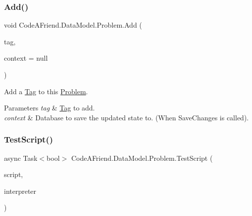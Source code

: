 \subsubsection{\texorpdfstring{Add()}{Add()}\hspace{0.1cm}{\footnotesize\ttfamily [3/3]}}
{\footnotesize\ttfamily void Code\+A\+Friend.\+Data\+Model.\+Problem.\+Add (\begin{DoxyParamCaption}\item[{\mbox{\hyperlink{class_code_a_friend_1_1_data_model_1_1_tag}{Tag}}}]{tag,  }\item[{Db\+Context}]{context = {\ttfamily null} }\end{DoxyParamCaption})}



Add a \mbox{\hyperlink{class_code_a_friend_1_1_data_model_1_1_tag}{Tag}} to this \mbox{\hyperlink{class_code_a_friend_1_1_data_model_1_1_problem}{Problem}}. 


\begin{DoxyParams}{Parameters}
{\em tag} & \mbox{\hyperlink{class_code_a_friend_1_1_data_model_1_1_tag}{Tag}} to add.\\
\hline
{\em context} & Database to save the updated state to. (When Save\+Changes is called).\\
\hline
\end{DoxyParams}
\mbox{\label{class_code_a_friend_1_1_data_model_1_1_problem_a9b792cd3ea05e6efcd351cf138d06516}} 
\subsubsection{\texorpdfstring{Test\+Script()}{TestScript()}}
{\footnotesize\ttfamily async Task$<$bool$>$ Code\+A\+Friend.\+Data\+Model.\+Problem.\+Test\+Script (\begin{DoxyParamCaption}\item[{\mbox{\hyperlink{class_code_a_friend_1_1_data_model_1_1_script}{Script}}}]{script,  }\item[{\mbox{\hyperlink{interface_code_a_friend_1_1_data_model_1_1_i_language_interpreter}{I\+Language\+Interpreter}}}]{interpreter }\end{DoxyParamCaption})}



